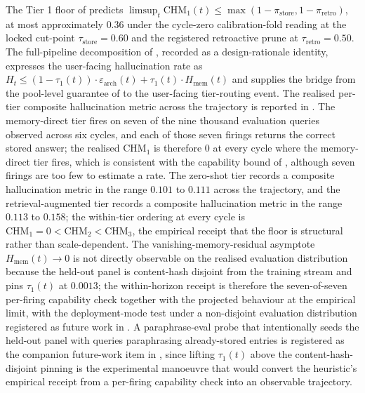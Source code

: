 The Tier 1 floor of  predicts $\limsup_{t} \mathrm{CHM}_{1}(t) \le \max(1-\pi_{\text{store}}, 1-\pi_{\text{retro}})$, at most approximately $0.36$ under the cycle-zero calibration-fold reading at the locked cut-point $\tau_{\text{store}}=0.60$ and the registered retroactive prune at $\tau_{\text{retro}}=0.50$. The full-pipeline decomposition of , recorded as a design-rationale identity, expresses the user-facing hallucination rate as $H_t \le (1-\tau_1(t)) \cdot \varepsilon_{\text{arch}}(t) + \tau_1(t) \cdot H_{\text{mem}}(t)$ and supplies the bridge from the pool-level guarantee of  to the user-facing tier-routing event. The realised per-tier composite hallucination metric across the trajectory is reported in . The memory-direct tier fires on seven of the nine thousand evaluation queries observed across six cycles, and each of those seven firings returns the correct stored answer; the realised $\mathrm{CHM}_1$ is therefore $0$ at every cycle where the memory-direct tier fires, which is consistent with the capability bound of , although seven firings are too few to estimate a rate. The zero-shot tier records a composite hallucination metric in the range $0.101$ to $0.111$ across the trajectory, and the retrieval-augmented tier records a composite hallucination metric in the range $0.113$ to $0.158$; the within-tier ordering at every cycle is $\mathrm{CHM}_1 = 0 < \mathrm{CHM}_2 < \mathrm{CHM}_3$, the empirical receipt that the floor is structural rather than scale-dependent. The vanishing-memory-residual asymptote $H_{\text{mem}}(t) \to 0$ is not directly observable on the realised evaluation distribution because the held-out panel is content-hash disjoint from the training stream and pins $\tau_1(t)$ at $0.0013$; the within-horizon receipt is therefore the seven-of-seven per-firing capability check together with the projected behaviour at the empirical limit, with the deployment-mode test under a non-disjoint evaluation distribution registered as future work in . A paraphrase-eval probe that intentionally seeds the held-out panel with queries paraphrasing already-stored entries is registered as the companion future-work item in , since lifting $\tau_1(t)$ above the content-hash-disjoint pinning is the experimental manoeuvre that would convert the heuristic's empirical receipt from a per-firing capability check into an observable trajectory.



